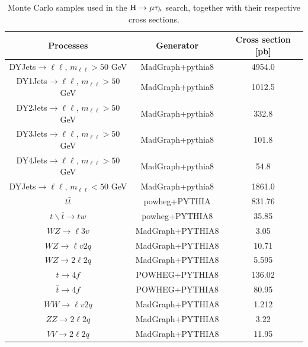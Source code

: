 \begin{table}[!hbpt]
\caption{Monte Carlo samples used in the $\mathrm{H}\to \mu\tau_{h}$ search, together with their respective cross sections.}
\begin{center}
\begin{tabular}{|c|c|c|}
\hline
Processes & Generator & Cross section [pb] \\\hline
DYJets$\to\ell \ell$, $m_{\ell \ell}>50$ GeV &MadGraph+pythia8   & 4954.0 \\\hline
DY1Jets$\to\ell \ell$, $m_{\ell \ell}>50$ GeV &MadGraph+pythia8 & 1012.5 \\\hline
DY2Jets$\to\ell \ell$, $m_{\ell \ell}>50$ GeV&MadGraph+pythia8  & 332.8 \\\hline
DY3Jets$\to\ell \ell$, $m_{\ell \ell}>50$ GeV&MadGraph+pythia8  & 101.8 \\\hline
DY4Jets$\to\ell \ell$, $m_{\ell \ell}>50$ GeV&MadGraph+pythia8  & 54.8 \\\hline
DYJets$\to\ell \ell$, $m_{\ell \ell}<50$ GeV&MadGraph+pythia8    & 1861.0 \\\hline
$t\bar{t}$                                                     & powheg+PYTHIA     &  831.76\\\hline
$t \backslash \bar{t}\to t w$                        & powheg+PYTHIA8     &  35.85 \\\hline
$WZ \to \ell 3v$                                          & MadGraph+PYTHIA8   &  3.05   \\\hline
$WZ \to \ell v 2q $                                      & MadGraph+PYTHIA8   &  10.71  \\\hline
$WZ \to 2 \ell 2q $                                      &  MadGraph+PYTHIA8  &  5.595 \\\hline
$t\to4f $                                                     & POWHEG+PYTHIA8       & 136.02\\\hline
$\bar{t}\to4f $                                             & POWHEG+PYTHIA8       & 80.95\\\hline
$WW \to \ell v 2q$                                      & MadGraph+PYTHIA8   &  1.212   \\\hline
$ZZ \to 2\ell 2q $                                        & MadGraph+PYTHIA8    &  3.22   \\\hline
$VV \to2\ell 2 q$                                        &  MadGraph+PYTHIA8   &  11.95  \\\hline

\end{tabular}
\end{center}
\label{tab:mutaumcsamples}
\end{table}

